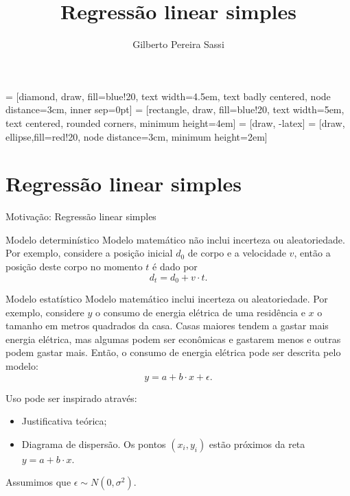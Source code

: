 \documentclass[8pt]{beamer}
\date{}
\title[Regressão linear]{Regressão linear simples}
\author[Gilberto Sassi]{Gilberto Pereira Sassi}
\institute[IME -- UFBA]{Universidade Federal da Bahia \\ Instituto de Matem\'{a}tica e Estat\'{i}stica\\ Departamento de Estat\'{i}stica }
\begin{document}
	
 = [diamond, draw, fill=blue!20, 
text width=4.5em, text badly centered, node distance=3cm, inner sep=0pt]
 = [rectangle, draw, fill=blue!20, 
text width=5em, text centered, rounded corners, minimum height=4em]
 = [draw, -latex]
 = [draw, ellipse,fill=red!20, node distance=3cm,
minimum height=2em]
	
\begin{frame}{}
	\maketitle
\end{frame}

\section{Regressão linear simples}

\begin{frame}{Motivação: Regressão linear simples}

\begin{block}{Modelo determinístico}
	\textcolor{important}{Modelo matemático não inclui incerteza ou aleatoriedade.} Por exemplo, considere a posição inicial $d_0$ de corpo e a velocidade $v$, então a posição deste corpo no momento $t$ é dado por
	$$d_t = d_0 + v \cdot t.$$
\end{block}
\vfill

\begin{block}{Modelo estatístico}
	\textcolor{important}{Modelo matemático inclui incerteza ou aleatoriedade.} Por exemplo, considere $y$ o consumo de energia elétrica de uma residência  e $x$ o tamanho em metros quadrados da casa. Casas maiores tendem a gastar mais energia elétrica, mas algumas podem ser econômicas e gastarem menos e outras podem gastar mais. Então, o consumo de energia elétrica pode ser descrita pelo modelo:
	$$y = a + b\cdot x + \epsilon.$$
	
	Uso pode ser inspirado através:
	\begin{itemize}
		\item Justificativa teórica;
		\item Diagrama de dispersão. Os pontos $(x_i, y_i)$ estão próximos da reta $y = a + b \cdot x$.
	\end{itemize}

	Assumimos que $\epsilon \sim N(0, \sigma^2)$.
\end{block}


\end{frame}
\end{document}
